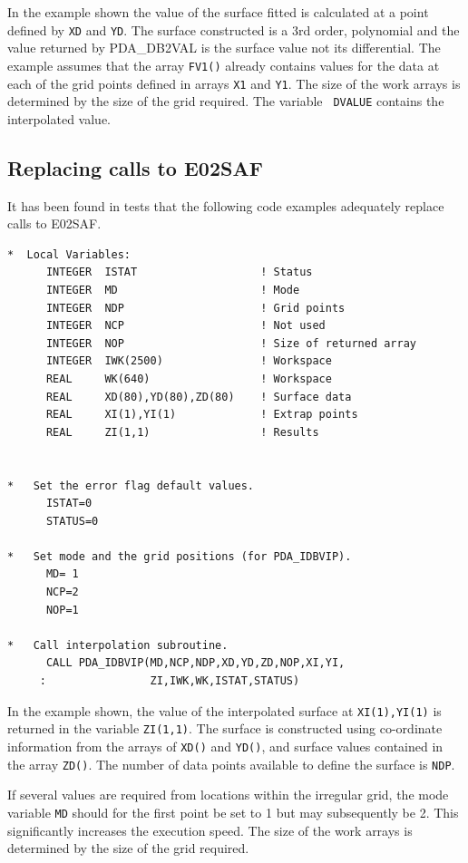 \documentclass[11pt,twoside]{article}
\newcommand{\xlabel}[1]{}
\begin{document}
In the example shown the value of the surface fitted is
calculated at a point defined by {\tt XD} and {\tt YD}. The
surface constructed is a 3rd order, polynomial and the value
returned by PDA\_DB2VAL is the surface value not its differential.
The example assumes that the array {\tt FV1()} already contains
values for the data at each of the grid points defined in
arrays {\tt X1} and {\tt Y1}. The size of the work arrays is
determined by the size of the grid required. The variable {\tt
DVALUE} contains the interpolated value.


\subsection{\xlabel{replacing_calls_to_e02saf}Replacing calls to E02SAF}

It has been found in tests that the following code examples adequately
replace calls to E02SAF.

\begin{verbatim}
*  Local Variables:
      INTEGER  ISTAT                   ! Status
      INTEGER  MD                      ! Mode
      INTEGER  NDP                     ! Grid points
      INTEGER  NCP                     ! Not used
      INTEGER  NOP                     ! Size of returned array
      INTEGER  IWK(2500)               ! Workspace
      REAL     WK(640)                 ! Workspace
      REAL     XD(80),YD(80),ZD(80)    ! Surface data
      REAL     XI(1),YI(1)             ! Extrap points
      REAL     ZI(1,1)                 ! Results


*   Set the error flag default values.
      ISTAT=0
      STATUS=0

*   Set mode and the grid positions (for PDA_IDBVIP).
      MD= 1
      NCP=2
      NOP=1

*   Call interpolation subroutine.
      CALL PDA_IDBVIP(MD,NCP,NDP,XD,YD,ZD,NOP,XI,YI,
     :                ZI,IWK,WK,ISTAT,STATUS)
\end{verbatim}

In the example shown, the value of the interpolated surface
at {\tt XI(1),YI(1)} is returned in the variable {\tt ZI(1,1)}.
The surface is constructed using
co-ordinate information from the arrays of {\tt XD()} and {\tt YD()},
and surface values contained in the array {\tt ZD()}. The number
of data points available to define the surface is {\tt NDP}.

If several values are required from locations within the
irregular grid, the mode variable {\tt MD} should for the first
point be set to 1 but may subsequently be 2. This
significantly increases the execution speed. The size of the work
arrays is determined by the size of the grid required.
\end{document}
